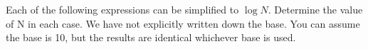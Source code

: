 
\newcommand{\MathsTwoLogsQFourWkg}[5]{
	\par
	\(
		{#1}^{#2} = #3
	\)
	\[
		\rightarrow
		\log_{#1}{\left(#3\right)} = #2
	\]
	\[
		=#4\dots
	\]
	\qSolMath{
		#5
	}{
		(3dp)
	}
}
\newcommand{\MathsTwoLogsQFourQs}[5]{
	\(
		{#1}^{#2} = #3
	\)
}
\newcommand{\MathsTwoLogsQFourSols}[6][(3dp)]{
	$#6$ #1
}

\question Each of the following expressions can be simplified to $\log N$.
Determine the value of N in each case. 
We have not explicitly written down the base. 
You can assume the base is 10, but the results are identical whichever 
base is used.
\begin{multicols}{4}
\end{multicols}
